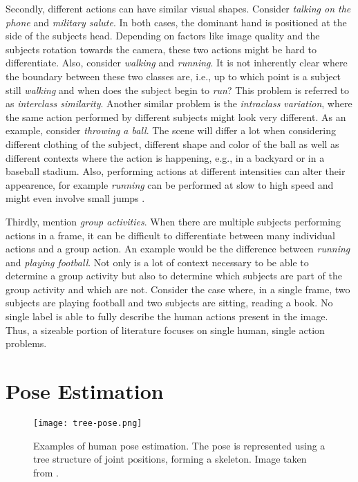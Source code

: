 Secondly, different actions can have similar visual shapes.
Consider \textit{talking on the phone} and \textit{military salute}.
In both cases, the dominant hand is positioned at the side of the subjects head.
Depending on factors like image quality and the subjects rotation towards the camera, these two actions might be hard to differentiate.
Also, consider \textit{walking} and \textit{running}.
It is not inherently clear where the boundary between these two classes are, i.e., up to which point is a subject still \textit{walking} and when does the subject begin to \textit{run}?
This problem is referred to as \textit{interclass similarity}.
Another similar problem is the \textit{intraclass variation}, where the same action performed by different subjects might look very different.
As an example, consider \textit{throwing a ball}.
The scene will differ a lot when considering different clothing of the subject, different shape and color of the ball as well as different contexts where the action is happening, e.g., in a backyard or in a baseball stadium.
Also, performing actions at different intensities can alter their appearence, for example \textit{running} can be performed at slow to high speed and might even involve small jumps \cite{kong_human_2018}.

Thirdly, \cite{zhang_review_2017} mention \textit{group activities}.
When there are multiple subjects performing actions in a frame, it can be difficult to differentiate between many individual actions and a group action.
An example would be the difference between \textit{running} and \textit{playing football}.
Not only is a lot of context necessary to be able to determine a group activity but also to determine which subjects are part of the group activity and which are not.
Consider the case where, in a single frame, two subjects are playing football and two subjects are sitting, reading a book.
No single label is able to fully describe the human actions present in the image.
Thus, a sizeable portion of literature focuses on single human, single action problems.

\section{Pose Estimation}
\label{sec:fund_poseestimation}
\begin{figure}[htb!]
    \centering
    \texttt{[image: tree-pose.png]}
    \caption{Examples of human pose estimation. The pose is represented using a tree structure of joint positions, forming a skeleton. Image taken from \cite{newell_stacked_2016}.}
    \label{fig:tree-skeleton}
\end{figure}

